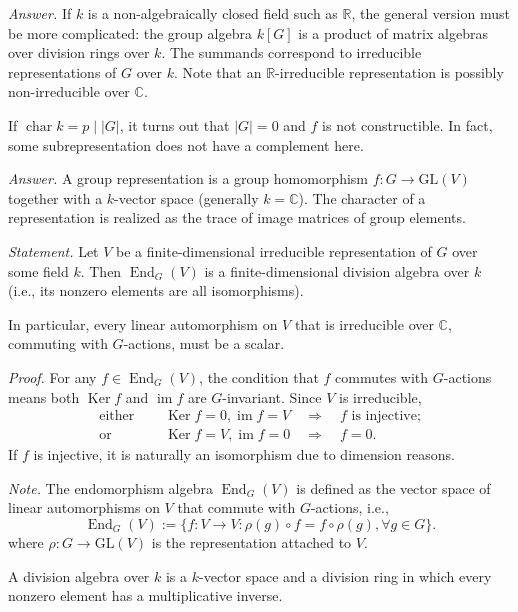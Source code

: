 \documentclass{mathproblems}
\newcommand\R{\mathbb{R}}
\newcommand\C{\mathbb{C}}
\newcommand\GL{\mathrm{GL}}
\DeclareMathOperator{\Ker}{Ker}
\DeclareMathOperator{\End}{End}
\begin{document}
\begin{questions}
\textit{Answer.} If $k$ is a non-algebraically closed field such as $\R$, the general version must be more complicated: the group algebra $k[G]$ is a product of matrix algebras over division rings over $k$. The summands correspond to irreducible representations of $G$ over $k$. Note that an $\R$-irreducible representation is possibly non-irreducible over $\C$.

If $\operatorname{char} k=p\mid |G|$, it turns out that $|G|=0$ and $f$ is not constructible. In fact, some subrepresentation does not have a complement here.


\textit{Answer.} A group representation is a group homomorphism $f: G\to \GL(V)$ together with a $k$-vector space (generally $k=\C$). The character of a representation is realized as the trace of image matrices of group elements.



{\color{violet}
\textit{Statement.} Let $V$ be a finite-dimensional irreducible representation of $G$ over some field $k$. Then $\End_G(V)$ is a finite-dimensional division algebra over $k$ (i.e., its nonzero elements are all isomorphisms).

In particular, every linear automorphism on $V$ that is irreducible over $\C$, commuting with $G$-actions, must be a scalar.}

\textit{Proof.} For any $f\in \End_G(V)$, the condition that $f$ commutes with $G$-actions means both $\Ker f$ and $\operatorname{im} f$ are $G$-invariant. Since $V$ is irreducible,
$$
\begin{aligned}
\text{either }\quad & \Ker f=0, \operatorname{im} f=V \quad \Longrightarrow \quad f \text{ is injective;}\\
\text{or }\quad & \Ker f=V, \operatorname{im} f=0 \quad \Longrightarrow \quad f=0.
\end{aligned}
$$
If $f$ is injective, it is naturally an isomorphism due to dimension reasons.

\textit{Note.} The endomorphism algebra $\End_G(V)$ is defined as the vector space of linear automorphisms on $V$ that commute with $G$-actions, i.e.,
$$
\End_G(V):=\{f:V\to V: \rho(g)\circ f=f\circ \rho(g), \forall g\in G\}.
$$
where $\rho: G\to \GL(V)$ is the representation attached to $V$.

A division algebra over $k$ is a $k$-vector space and a division ring in which every nonzero element has a multiplicative inverse.


\end{questions}
\end{document}
